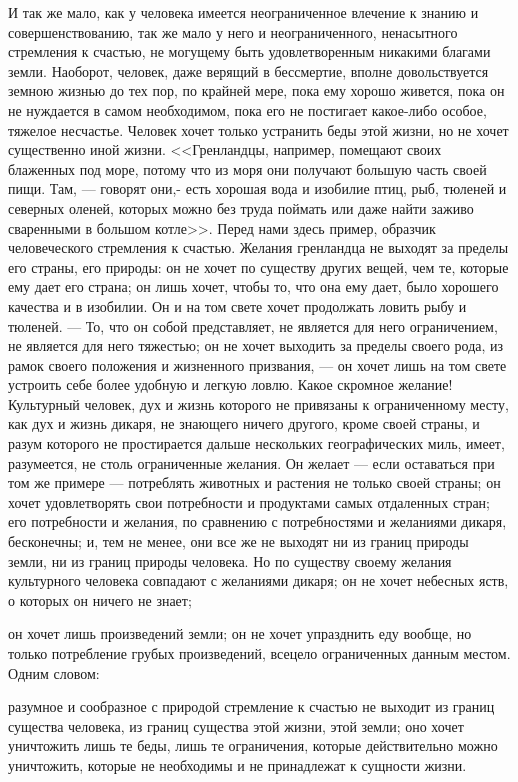 \documentclass[12pt]{article}
\begin{document}
И так же мало, как у человека имеется неограниченное влечение к знанию и совершенствованию, так же мало у него и неограниченного, ненасытного стремления к счастью, не могущему быть удовлетворенным никакими благами земли. Наоборот, человек, даже верящий в бессмертие, вполне довольствуется земною жизнью до тех пор, по крайней мере, пока ему хорошо живется, пока он не нуждается в самом необходимом, пока его не постигает какое-либо особое, тяжелое несчастье. Человек хочет только устранить беды этой жизни, но не хочет существенно иной жизни. <<Гренландцы, например, помещают своих блаженных под море, потому что из моря они получают большую часть своей пищи. Там, --- говорят они,- есть хорошая вода и изобилие птиц, рыб, тюленей и северных оленей, которых можно без труда поймать или даже найти заживо сваренными в большом котле>>. Перед нами здесь пример, образчик человеческого стремления к счастью. Желания гренландца не выходят за пределы его страны, его природы: он не хочет по существу других вещей, чем те, которые ему дает его страна; он лишь хочет, чтобы то, что она ему дает, было хорошего качества и в изобилии. Он и на том свете хочет продолжать ловить рыбу и тюленей. --- То, что он собой представляет, не является для него ограничением, не является для него тяжестью; он не хочет выходить за пределы своего рода, из рамок своего положения и жизненного призвания, --- он хочет лишь на том свете устроить себе более удобную и легкую ловлю. Какое скромное желание! Культурный человек, дух и жизнь которого не привязаны к ограниченному месту, как дух и жизнь дикаря, не знающего ничего другого, кроме своей страны, и разум которого не простирается дальше нескольких географических миль, имеет, разумеется, не столь ограниченные желания. Он желает --- если оставаться при том же примере --- потреблять животных и растения не только своей страны; он хочет удовлетворять свои потребности и продуктами самых отдаленных стран; его потребности и желания, по сравнению с потребностями и желаниями дикаря, бесконечны; и, тем не менее, они все же не выходят ни из границ природы земли, ни из границ природы человека. Но по существу своему желания культурного человека совпадают с желаниями дикаря; он не хочет небесных яств, о которых он ничего не знает; 

он хочет лишь произведений земли; он не хочет упразднить еду вообще, но только потребление грубых произведений, всецело ограниченных данным местом. Одним словом: 

разумное и сообразное с природой стремление к счастью не выходит из границ существа человека, из границ существа этой жизни, этой земли; оно хочет уничтожить лишь те беды, лишь те ограничения, которые действительно можно уничтожить, которые не необходимы и не принадлежат к сущности жизни. 
\end{document}

